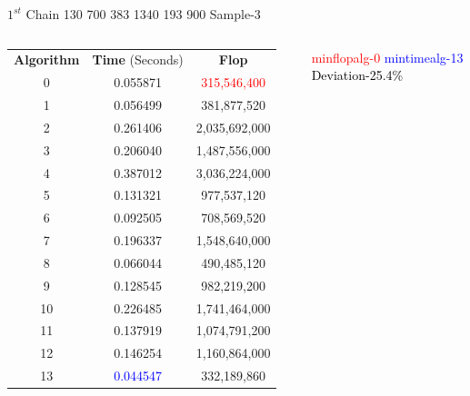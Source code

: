 \documentclass[10pts]{beamer}
\begin{document}
	    \begin{frame}{$1^{st}$ Chain 130 700 383 1340 193 900 \hspace{75pt}   Sample-3}
	    	\begin{columns}
	    		
	    		\begin{tabular}{c | c | c}
	    			\textbf{Algorithm}  & \textbf{Time} (Seconds) & \textbf{Flop}\\		
	    			0 	&	0.055871 	&	\textcolor{red}{315,546,400} 	\\		
	    			1 	&	0.056499 	&	381,877,520 	\\		
	    			2 	&	0.261406 	&	2,035,692,000 	\\		
	    			3 	&	0.206040 	&	1,487,556,000	\\		
	    			4 	&	0.387012 	&	3,036,224,000	\\		
	    			5 	&	0.131321 	&	977,537,120 	\\		
	    			6 	&	0.092505 	&	708,569,520 	\\		
	    			7 	&	0.196337 	&	1,548,640,000 	\\		
	    			8 	&	0.066044 	&	490,485,120 	\\		
	    			9 	&	0.128545 	&	982,219,200	\\		
	    			10 	&	0.226485 	&	1,741,464,000 	\\		
	    			11 	&	0.137919 	&	1,074,791,200	\\		
	    			12 	&	0.146254 	&	1,160,864,000 	\\		
	    			13 	&	\textcolor{blue}{0.044547} 	&	332,189,860 \\
	    			
	    		\end{tabular}
	    		
	    		
	    		\textcolor{red}{min\textunderscore flop\textunderscore alg-0}
	    		\textcolor{blue}{min\textunderscore time\textunderscore alg-13}
	    		\textcolor{black}{Deviation-25.4\%}
	    	\end{columns}
	    \end{frame} 
	    
\end{document}
